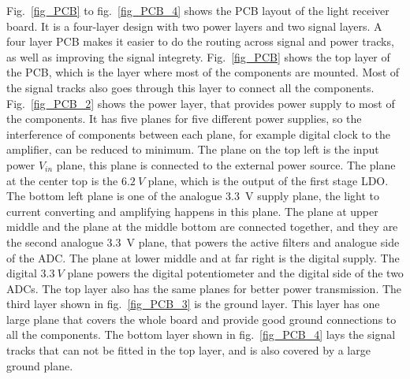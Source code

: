 Fig.~\ref{fig_PCB} to fig.~\ref{fig_PCB_4} shows the PCB layout of the light receiver board.  It is a four-layer design with two power layers and two signal layers.  A four layer PCB makes it easier to do the routing across signal and power tracks, as well as improving the signal integrety.  Fig.~\ref{fig_PCB} shows the top layer of the PCB, which is the layer where most of the components are mounted.  Most of the signal tracks also goes through this layer to connect all the components.  Fig.~\ref{fig_PCB_2} shows the power layer, that provides power supply to most of the components.  It has five planes for five different power supplies, so the interference of components between each plane, for example digital clock to the amplifier, can be reduced to minimum.  The plane on the top left is the input power $V_{in}$ plane, this plane is connected to the external power source.  The plane at the center top is the $\qty{6.2}{V}$ plane, which is the output of the first stage LDO.  The bottom left plane is one of the analogue \qty{3.3}{V} supply plane, the light to current converting and amplifying happens in this plane. The plane at upper middle and the plane at the middle bottom are connected together, and they are the second analogue \qty{3.3}{V} plane, that powers the active filters and analogue side of the ADC.  The plane at lower middle and at far right is the digital supply.  The digital $\qty{3.3}{V}$ plane powers the digital potentiometer and the digital side of the two ADCs.  The top layer also has the same planes for better power transmission.  The third layer shown in fig.~\ref{fig_PCB_3} is the ground layer.  This layer has one large plane that covers the whole board and provide good ground connections to all the components.  The bottom layer shown in fig.~\ref{fig_PCB_4} lays the signal tracks that can not be fitted in the top layer, and is also covered by a large ground plane.

